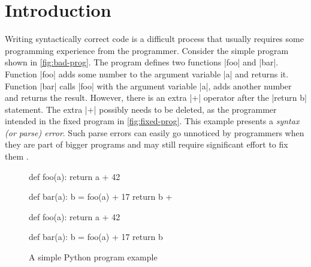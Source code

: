 \section{Introduction}
\label{sec:intro}

Writing syntactically correct code is a difficult process that usually requires
some programming experience from the programmer. Consider the simple program
shown in \autoref{fig:bad-prog}. The program defines two functions |foo| and
|bar|. Function |foo| adds some number to the argument variable |a| and returns
it. Function |bar| calls |foo| with the argument variable |a|, adds another
number and returns the result. However, there is an extra |+| operator after the
|return b| statement. The extra |+| possibly needs to be deleted, as the
programmer intended in the fixed program in \autoref{fig:fixed-prog}. This
example presents a \emph{syntax (or parse) error}. Such parse errors can easily
go unnoticed \citep{Denny_2012, Ahadi_2018} by programmers when they are part of
bigger programs and may still require significant effort to fix them
\citep{Kummerfeld2003}.


\begin{figure}[h]
\centering
\begin{minipage}[c]{0.48\linewidth}
\begin{ecode}
def foo(a):
  return a + 42

def bar(a):
  b = foo(a) + 17
  return b +
\end{ecode}
\label{fig:bad-prog}
\end{minipage}%
\hspace{0.02\linewidth}%
\begin{minipage}[c]{0.48\linewidth}
\begin{ecode}
def foo(a):
  return a + 42

def bar(a):
  b = foo(a) + 17
  return b
\end{ecode}
\label{fig:fixed-prog}
\end{minipage}
\caption{A simple Python program example}
\label{fig:example-prog}
\end{figure}

